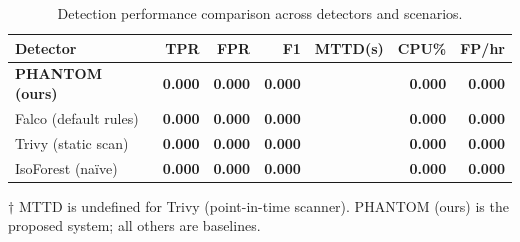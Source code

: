 \begin{table}[h]
\centering
\caption{Detection performance comparison across detectors and scenarios.}
\label{tab:detection_performance}
\begin{tabular}{lrrrrrr}
\hline
Detector & TPR & FPR & F1 & MTTD(s) & CPU\% & FP/hr \\
\hline
\textbf{PHANTOM (ours)} & \textbf{0.000} & \textbf{0.000} & \textbf{0.000} & \text{---} & \textbf{0.000} & \textbf{0.000} \\
Falco (default rules) & \textbf{0.000} & \textbf{0.000} & \textbf{0.000} & \text{---} & \textbf{0.000} & \textbf{0.000} \\
Trivy (static scan) & \textbf{0.000} & \textbf{0.000} & \textbf{0.000} & \text{---} & \textbf{0.000} & \textbf{0.000} \\
IsoForest (na\"{i}ve) & \textbf{0.000} & \textbf{0.000} & \textbf{0.000} & \text{---} & \textbf{0.000} & \textbf{0.000} \\
\hline
\end{tabular}
\vspace{0.5em}
\footnotesize{$\dagger$ MTTD is undefined for Trivy (point-in-time scanner). PHANTOM (ours) is the proposed system; all others are baselines.}
\end{table}